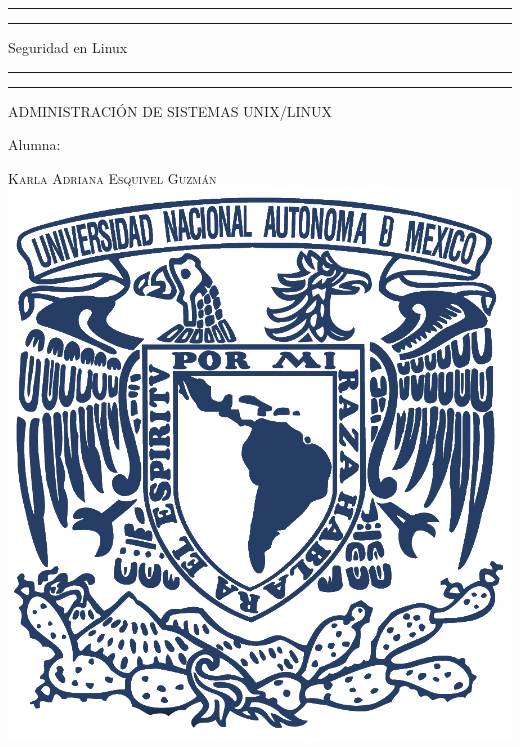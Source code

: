 \documentclass[a4paper, 11pt, oneside]{article}
\begin{document}
 

\begin{titlepage} 

	\centering 
	
	\scshape 
	
	\vspace*{\baselineskip} 
	
	
	
	\rule{\textwidth}{1.6pt}\vspace*{-\baselineskip}\vspace*{2pt} 
	\rule{\textwidth}{0.4pt} 
	
	\vspace{0.75\baselineskip} 
	
	{\LARGE Seguridad en Linux}	
	\vspace{0.75\baselineskip} 
	
	\rule{\textwidth}{0.4pt}\vspace*{-\baselineskip}\vspace{3.2pt}
	\rule{\textwidth}{1.6pt} 
	
	\vspace{2\baselineskip} 
	

	ADMINISTRACIÓN DE SISTEMAS UNIX/LINUX
	
	\vspace*{3\baselineskip} 
	
	
	
	Alumna:
	
	\vspace{0.5\baselineskip} 
	
	{\scshape\Large Karla Adriana Esquivel Guzmán \\} 
	\vspace{0.5\baselineskip} 
	\vfill
	\includegraphics{unam.jpg}
	

\end{titlepage}
\end{document}
